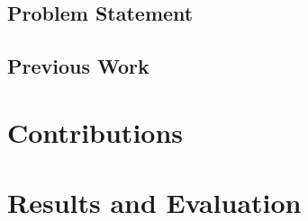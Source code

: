 \subsection{Problem Statement}

\subsection{Previous Work}

\section{Contributions}

\section{Results and Evaluation}
